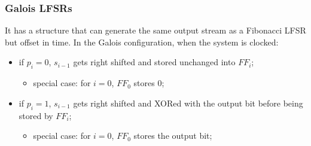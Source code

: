 \documentclass[11pt, a4paper]{article}
\begin{document}
\newpage
\subsubsection{Galois LFSRs}
It has a structure that can generate the same output stream as a Fibonacci LFSR but offset in time. In the Galois configuration, when the system is clocked:
\begin{itemize}
    \item if $p_i=0$, $s_{i-1}$ gets right shifted and stored unchanged into $FF_i$;
    \begin{itemize}
        \item special case: for $i=0$, $FF_0$ stores 0;
    \end{itemize}
    \item if $p_i=1$, $s_{i-1}$ gets right shifted and XORed with the output bit before being stored by $FF_i$;
    \begin{itemize}
        \item special case: for $i=0$, $FF_0$ stores the output bit;
    \end{itemize}
\end{itemize}
\end{document}
